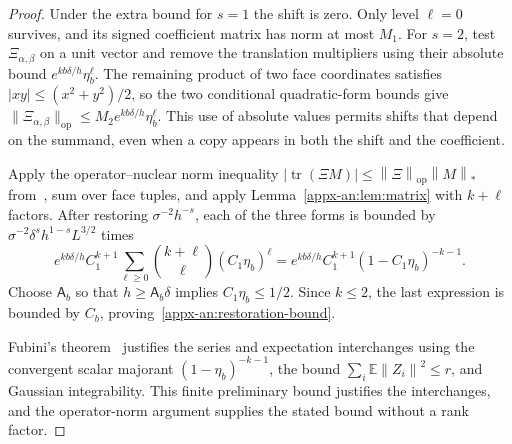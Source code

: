 \documentclass[11pt,letterpaper]{article}
\theoremstyle{remark}
\newcommand{\E}{\mathbb E}
\newcommand{\tr}{\operatorname{tr}}
\newcommand{\op}{\mathrm{op}}
\newcommand{\norm}[1]{\left\lVert#1\right\rVert}
\begin{document}
\begin{proof}
Under the extra bound for $s=1$ the shift is zero. Only level $\ell=0$ survives, and its signed coefficient matrix has norm at most $M_1$. For $s=2$, test $\Xi_{\alpha,\beta}$ on a unit vector and remove the translation multipliers using their absolute bound $e^{kb\delta/h}\eta_b^\ell$. The remaining product of two face coordinates satisfies $|xy|\le(x^2+y^2)/2$, so the two conditional quadratic-form bounds give $\|\Xi_{\alpha,\beta}\|_{\op}\le M_2 e^{kb\delta/h}\eta_b^\ell$. This use of absolute values permits {shifts that depend on the summand, even when a copy appears} in both the shift and the coefficient.

Apply the operator--nuclear norm inequality
\(|\tr(\Xi M)|\le\norm\Xi_\op\norm M_*\)
from~\cite[Chapter~IV]{Bhatia1997}, sum over face
tuples, and apply Lemma~\ref{appx-an:lem:matrix} with \(k+\ell\) factors.
After restoring \(\sigma^{-2}h^{-s}\), each of the three forms
is bounded by \(\sigma^{-2}\delta^sh^{1-s}L^{3/2}\) times
\[
 e^{kb\delta/h}C_1^{k+1}
 \sum_{\ell\ge0}\binom{k+\ell}{\ell}(C_1\eta_b)^\ell
 =e^{kb\delta/h}C_1^{k+1}(1-C_1\eta_b)^{-k-1}.
\]
Choose \(\mathsf A_b\) so that \(h\ge\mathsf A_b\delta\) implies
\(C_1\eta_b\le1/2\). Since \(k\le2\), the last expression is
bounded by \(C_b\), proving~\eqref{appx-an:restoration-bound}.

Fubini's theorem~\cite[Section~2.5]{Folland1999} justifies the
series and expectation interchanges using the convergent scalar
majorant \((1-\eta_b)^{-k-1}\), the bound
\(\sum_i\E\norm{Z_i}^2\le r\), and Gaussian integrability.
This finite preliminary bound justifies the interchanges, and the
operator-norm argument supplies the stated bound without a rank factor.
\end{proof}
\end{document}
